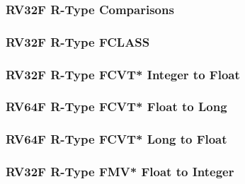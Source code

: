 

\subsubsection[{\small RV32F R-Type Comparisons}]{RV32F R-Type Comparisons} \label{sec:format-RV32F-RTypeFCMP}



\subsubsection[{\small RV32F R-Type FCLASS}]{RV32F R-Type FCLASS} \label{sec:format-RV32F-RTypeFF2I}



\subsubsection[{\small RV32F R-Type FCVT* Integer to Float}]{RV32F R-Type FCVT* Integer to Float} \label{sec:format-RV32F-RTypeFCI2F}



\subsubsection[{\small RV64F R-Type FCVT* Float to Long}]{RV64F R-Type FCVT* Float to Long} \label{sec:format-RV64F-RTypeFCF2L}



\subsubsection[{\small RV64F R-Type FCVT* Long to Float}]{RV64F R-Type FCVT* Long to Float} \label{sec:format-RV64F-RTypeFCL2F}



\subsubsection[{\small RV32F R-Type FMV* Float to Integer}]{RV32F R-Type FMV* Float to Integer} \label{sec:format-RV32F-RTypeFMF2I}

